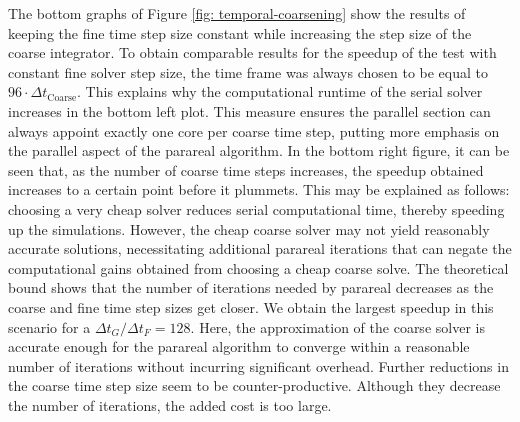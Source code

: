 The bottom graphs of Figure \ref{fig: temporal-coarsening} show the results of keeping the fine time step size constant while increasing the step size of the coarse integrator. To obtain comparable results for the speedup of the test with constant fine solver step size, the time frame was always chosen to be equal to $96\cdot\Delta t_\mathrm{Coarse}$. This explains why the computational runtime of the serial solver increases in the bottom left plot. This measure ensures the parallel section can always appoint exactly one core per coarse time step, putting more emphasis on the parallel aspect of the parareal algorithm. In the bottom right figure, it can be seen that, as the number of coarse time steps increases, the speedup obtained increases to a certain point before it plummets. This may be explained as follows: choosing a very cheap solver reduces serial computational time, thereby speeding up the simulations. However, the cheap coarse solver may not yield reasonably accurate solutions, necessitating additional parareal iterations that can negate the computational gains obtained from choosing a cheap coarse solve. The theoretical bound shows that the number of iterations needed by parareal decreases as the coarse and fine time step sizes get closer. We obtain the largest speedup in this scenario for a $\Delta t_G/\Delta t_F = 128$. 
Here, the approximation of the coarse solver is accurate enough for the parareal algorithm to converge within a reasonable number of iterations without incurring significant overhead. Further reductions in the coarse time step size seem to be counter-productive. Although they decrease the number of iterations, the added cost is too large.

